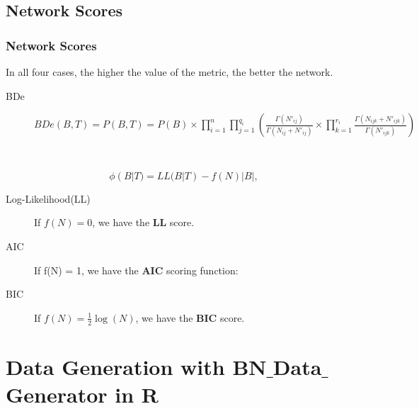 \documentclass{beamer}
\begin{document}
	
\subsection{Network Scores}
\begin{frame}
\frametitle{Network Scores}
{\scriptsize{}
In all four cases, the higher the value of the metric, the better the network.
\begin{description}
	\item[BDe]
	$BDe(B,T) = P(B,T)=P(B)\times\prod_{i=1}^{n}\prod_{j=1}^{q_{i}}(\frac{\Gamma(N'_{ij})}{\Gamma(N_{ij}+N'_{ij})}\times\prod_{k=1}^{r_{i}}\frac{\Gamma(N_{ijk}+N'_{ijk})}{\Gamma(N'_{ijk})})$
\end{description}

{}\

$$\phi(B|T) = LL(B|T) - f(N)|B|,$$

\begin{description}
	\item[Log-Likelihood(LL)] If $f(N) = 0$, we have the \textbf{LL} score.
	
	\item[AIC] If f(N) = 1, we have the \textbf{AIC} scoring function:
	
	\item[BIC] If $f(N) = \frac{1}{2} \log(N)$, we have the \textbf{BIC} score.
\end{description}
}
\end{frame}






\section{Data Generation with BN$\_$Data$\_$Generator in R}
\end{document}
